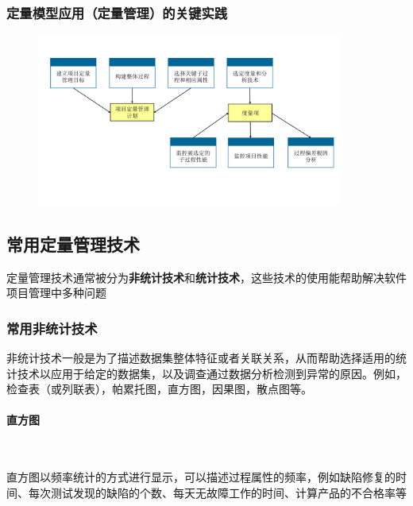 \subsubsection{定量模型应用（定量管理）的关键实践}
\begin{figure}[H]
    \vspace{-0.5em}
	\centering
	\includegraphics[width=0.9\textwidth]{images/定量模型应用（定量管理）的关键实践.pdf}
    \vspace{-1em}
\end{figure}

\subsection{常用定量管理技术}
定量管理技术通常被分为\textbf{非统计技术}和\textbf{统计技术}，这些技术的使用能帮助解决软件项目管理中多种问题

\subsubsection{常用非统计技术}
非统计技术一般是为了描述数据集整体特征或者关联关系，从而帮助选择适用的统计技术以应用于给定的数据集，以及调查通过数据分析检测到异常的原因。例如，检查表（或列联表），帕累托图，直方图，因果图，散点图等。


\paragraph{直方图}~{} \par
直方图以频率统计的方式进行显示，可以描述过程属性的频率，例如缺陷修复的时间、每次测试发现的缺陷的个数、每天无故障工作的时间、计算产品的不合格率等

